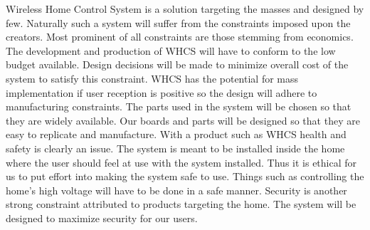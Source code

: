 Wireless Home Control System is a solution targeting the masses and designed by
few. Naturally such a system will suffer from the constraints imposed upon the
creators. Most prominent of all constraints are those stemming from economics.
The development and production of WHCS will have to conform to the low budget
available. Design decisions will be made to minimize overall cost of the system
to satisfy this constraint. WHCS has the potential for mass implementation if
user reception is positive so the design will adhere to manufacturing
constraints. The parts used in the system will be chosen so that they are
widely available. Our boards and parts will be designed so that they are easy
to replicate and manufacture. With a product such as WHCS health and safety is
clearly an issue. The system is meant to be installed inside the home where the
user should feel at use with the system installed. Thus it is ethical for us to
put effort into making the system safe to use. Things such as controlling the
home{}'s high voltage will have to be done in a safe manner. Security is
another strong constraint attributed to products targeting the home. The system
will be designed to maximize security for our users.
